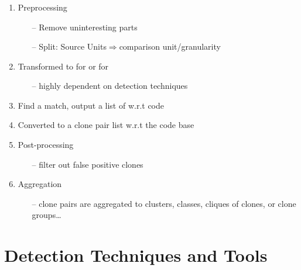 \documentclass[pdf]{beamer}
\begin{document}
\begin{frame}
\frametitle{\secname}
\begin{block}{}
\begin{enumerate}[a]
  \item Preprocessing
  \begin{itemize}
    \item[--] Remove uninteresting parts
    \item[--] Split: Source Units$\Longrightarrow$comparison
    unit\slash granularity
  \end{itemize}
  \item Transformed to  for
   or for 
  \begin{itemize}
    \item[--]highly dependent on detection techniques
  \end{itemize}
  \item Find a match, output a list of  w.r.t  code
  \item Converted to a clone pair list w.r.t the 
  code base
  \item Post-processing
  \begin{itemize}
    \item[--]filter out false positive clones
  \end{itemize}
  \item Aggregation
  \begin{itemize}
    \item[--]clone pairs are aggregated to clusters, classes, cliques
    of clones, or clone groups\ldots
  \end{itemize}
\end{enumerate}
\end{block}
\end{frame}


\section{Detection Techniques and Tools}
\end{document}
